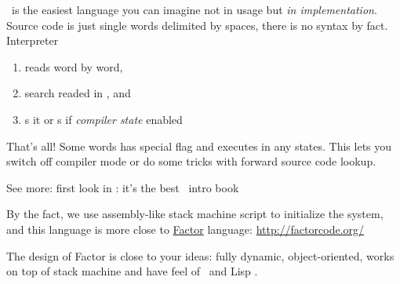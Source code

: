 \clearpage\secrel{\F}\label{whyFORTH}

\F\ is the easiest language you can imagine not in usage but \emph{in
implementation}. Source code is just single words delimited by spaces, there is
no syntax by fact.
% 
Interpreter
\begin{enumerate}[nosep]
  \item reads  word by word,
  \item search readed  in , and
  \item {}s it or s if \textit{compiler state} enabled
\end{enumerate}

\noindent
That's all! Some words has special  flag and executes in any states.
This lets you switch off compiler mode or do some tricks with forward source
code lookup.

\bigskip\noindent
See more: first look in \cite{kelly,kellyru}: it's the best \F\ intro book 

\secdown
{}

By the fact, we use assembly-like stack machine script to initialize the system,
and this language is more close to \href{http://factorcode.org/}{Factor}
language:
\url{http://factorcode.org/}

\bigskip\noindent
The design of Factor is close to your ideas: fully dynamic, object-oriented,
works on top of stack machine and have feel of \ST\ and Lisp
.

\secup
